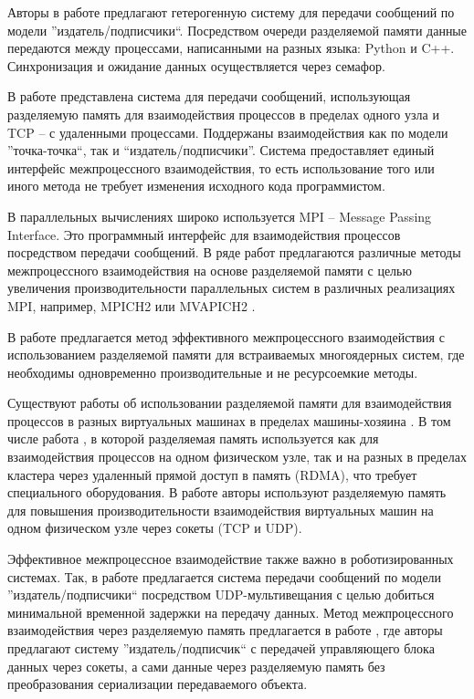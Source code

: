 Авторы в работе \cite{7790679} предлагают гетерогенную систему для передачи сообщений по модели ''издатель/подписчики``. Посредством очереди разделяемой памяти данные передаются между процессами, написанными на разных языка: Python и C++. Синхронизация и ожидание данных осуществляется через семафор.

В работе \cite{ShMemTransportThesis} представлена система для передачи сообщений, использующая разделяемую память для взаимодействия процессов в пределах одного узла и TCP -- с удаленными процессами. Поддержаны взаимодействия как по модели ''точка-точка``, так и ``издатель/подписчики''. Система предоставляет единый интерфейс межпроцессного взаимодействия, то есть использование того или иного метода не требует изменения исходного кода программистом.

В параллельных вычислениях широко используется MPI -- Message Passing Interface. Это программный интерфейс для взаимодействия процессов посредством передачи сообщений. В ряде работ предлагаются различные методы межпроцессного взаимодействия на основе разделяемой памяти с целью увеличения производительности параллельных систем в различных реализациях MPI, например, MPICH2 \cite{10.1007/11846802_19, 8665755} или MVAPICH2 \cite{4100356, 4663761}.

В работе \cite{HPCInterCoreLinux} предлагается метод эффективного межпроцессного взаимодействия с использованием разделяемой памяти для встраиваемых многоядерных систем, где необходимы одновременно производительные и не ресурсоемкие методы.

Существуют работы об использовании разделяемой памяти для взаимодействия процессов в разных виртуальных машинах в пределах машины-хозяина \cite{IPCInterVirtualMachineShmem, IPCInterVirtualMachineShmemOptimizations, 10.1145/2847562, 10.1007/978-3-642-00955-6_7}. В том числе работа \cite{234795}, в которой разделяемая память используется как для взаимодействия процессов на одном физическом узле, так и на разных в пределах кластера через удаленный прямой доступ в память (RDMA), что требует специального оборудования. В работе \cite{7416013} авторы используют разделяемую память для повышения производительности взаимодействия виртуальных машин на одном физическом узле через сокеты (TCP и UDP).

Эффективное межпроцессное взаимодействие также важно в роботизированных системах. Так, в работе \cite{5649358} предлагается система передачи сообщений по модели ''издатель/подписчики`` посредством UDP-мультивещания с целью добиться минимальной временной задержки на передачу данных. Метод межпроцессного взаимодействия через разделяемую память предлагается в работе \cite{Wang2019TZCEI}, где авторы предлагают систему ''издатель/подписчик`` с передачей управляющего блока данных через сокеты, а сами данные через разделяемую память без преобразования сериализации передаваемого объекта.

